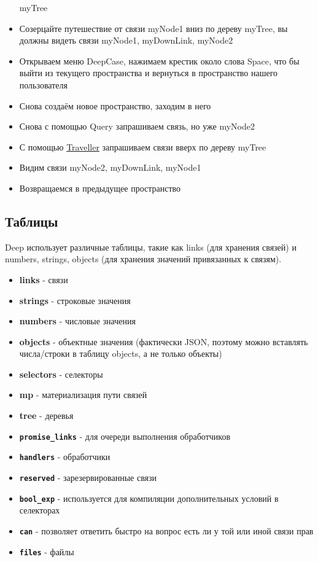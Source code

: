 \documentclass{article}
\begin{document}
\begin{itemize}
        myTree
  \item Созерцайте путешествие от связи myNode1 вниз по дереву myTree, вы
        должны видеть связи myNode1, myDownLink, myNode2
  \item Открываем меню DeepCase, нажимаем крестик около слова Space, что бы
        выйти из текущего пространства и вернуться в пространство нашего пользователя
  \item Снова создаём новое пространство, заходим в него
  \item Снова с помощью Query запрашиваем связь, но уже myNode2
  \item С помощью \hyperlink{Traveller.Def}{Traveller} запрашиваем связи вверх
        по дереву myTree
  \item Видим связи myNode2, myDownLink, myNode1
  \item Возвращаемся в предыдущее пространство
\end{itemize}

\subsection{Таблицы}
Deep использует различные таблицы, такие как links (для хранения связей) и
numbers, strings, objects (для хранения значений привязанных к связям).

\begin{itemize}
  \item \textbf{links} - связи
  \item \textbf{strings} - строковые значения
  \item \textbf{numbers} - числовые значения
  \item \textbf{objects} - объектные значения (фактически JSON, поэтому можно
        вставлять числа/строки в таблицу objects, а не только объекты)
  \item \textbf{selectors} - селекторы
  \item \textbf{mp} - материализация пути связей
  \item \textbf{tree} - деревья
  \item \textbf{\texttt{promise\_links}} - для очереди выполнения обработчиков
  \item \textbf{\texttt{handlers}} - обработчики
  \item \textbf{\texttt{reserved}} - зарезервированные связи
  \item \textbf{\texttt{bool\_exp}} - используется для компиляции
        дополнительных условий в селекторах
  \item \textbf{\texttt{can}} - позволяет ответить быстро на вопрос есть ли у
        той или иной связи прав
  \item \textbf{\texttt{files}} - файлы
\end{itemize}
\end{document}
